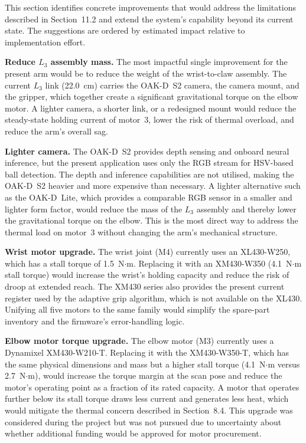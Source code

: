 
This section identifies concrete improvements that would
address the limitations described in Section~11.2 and extend
the system's capability beyond its current state. The
suggestions are ordered by estimated impact relative to
implementation effort.


\textbf{Reduce $L_3$ assembly mass.} The most impactful single
improvement for the present arm would be to reduce the weight
of the wrist-to-claw assembly. The current $L_3$ link
(22.0~cm) carries the OAK-D~S2 camera, the camera mount, and
the gripper, which together create a significant gravitational
torque on the elbow motor. A lighter camera, a shorter link,
or a redesigned mount would reduce the steady-state holding
current of motor~3, lower the risk of thermal overload, and
reduce the arm's overall sag.

\textbf{Lighter camera.} The OAK-D~S2 provides depth sensing
and onboard neural inference, but the present application uses
only the RGB stream for HSV-based ball detection. The depth
and inference capabilities are not utilised, making the
OAK-D~S2 heavier and more expensive than necessary. A lighter
alternative such as the OAK-D~Lite, which provides a
comparable RGB sensor in a smaller and lighter form factor,
would reduce the mass of the $L_3$ assembly and thereby lower
the gravitational torque on the elbow. This is the most direct
way to address the thermal load on motor~3 without changing the
arm's mechanical structure.

\textbf{Wrist motor upgrade.} The wrist joint (M4) currently
uses an XL430-W250, which has a stall torque of 1.5~N$\cdot$m.
Replacing it with an XM430-W350 (4.1~N$\cdot$m stall torque)
would increase the wrist's holding capacity and reduce the risk
of droop at extended reach. The XM430 series also provides the
present current register used by the adaptive grip algorithm,
which is not available on the XL430. Unifying all five motors
to the same family would simplify the spare-part inventory and
the firmware's error-handling logic.

\textbf{Elbow motor torque upgrade.} The elbow motor (M3)
currently uses a Dynamixel XM430-W210-T. Replacing it with the
XM430-W350-T, which has the same physical dimensions and mass
but a higher stall torque (4.1~N$\cdot$m versus 2.7~N$\cdot$m),
would increase the torque margin at the scan pose and reduce
the motor's operating point as a fraction of its rated capacity.
A motor that operates further below its stall torque draws less
current and generates less heat, which would mitigate the
thermal concern described in Section~8.4. This upgrade was
considered during the project but was not pursued due to
uncertainty about whether additional funding would be approved
for motor procurement.

